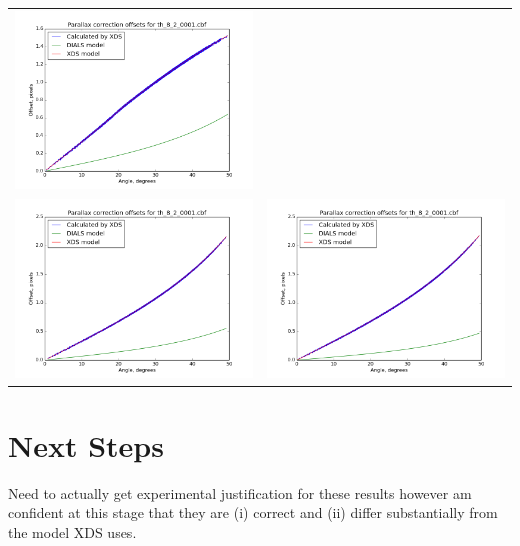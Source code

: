 \documentclass{article}
\begin{document}
{\begin{tabular}{cc}
\includegraphics[scale=0.3]{corrections14000.png} \\
\includegraphics[scale=0.3]{corrections16000.png} & 
\includegraphics[scale=0.3]{corrections18000.png} \\
\end{tabular}
}

\section{Next Steps}

Need to actually get experimental justification for these results
however am confident at this stage that they are (i) correct and (ii)
differ substantially from the model XDS uses.
\end{document}

